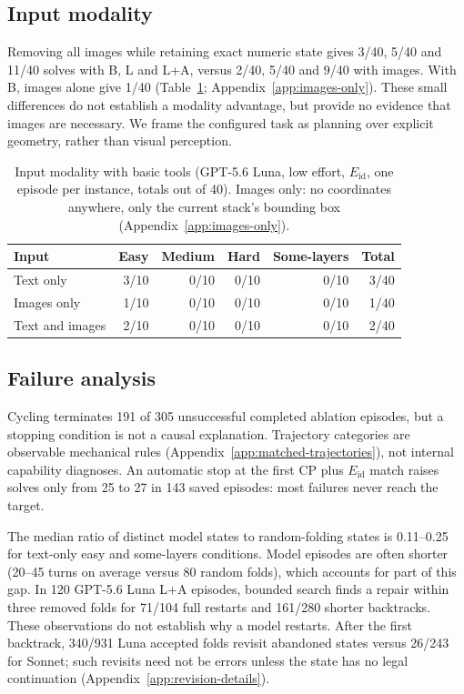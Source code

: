 \subsection{Input modality}
\label{sec:results-matched}\label{sec:results-textonly}
Removing all images while retaining exact numeric state gives 3/40, 5/40 and 11/40
solves with B, L and L+A, versus 2/40, 5/40 and 9/40 with images. With B, images
alone give 1/40 (Table~\ref{tab:modality}; Appendix~\ref{app:images-only}). These small
differences do not establish a modality advantage, but provide no evidence that images
are necessary. We frame the configured task as planning over explicit geometry,
rather than visual perception.
\begin{table}[htbp]
\centering
\caption{Input modality with basic tools (GPT-5.6 Luna, low effort, $E_{\mathrm{id}}$, one episode
per instance, totals out of 40). Images only: no coordinates anywhere, only the current stack's
bounding box (Appendix~\ref{app:images-only}).}
\label{tab:modality}
\small
\begin{tabular}{lrrrrr}
\hline
Input & Easy & Medium & Hard & Some-layers & Total \\
\hline
Text only & 3/10 & 0/10 & 0/10 & 0/10 & 3/40 \\
Images only & 1/10 & 0/10 & 0/10 & 0/10 & 1/40 \\
Text and images & 2/10 & 0/10 & 0/10 & 0/10 & 2/40 \\
\hline
\end{tabular}
\end{table}
\subsection{Failure analysis}
\label{sec:results-failures}
Cycling terminates 191 of 305 unsuccessful completed ablation episodes, but a stopping
condition is not a causal explanation. Trajectory categories are observable mechanical
rules (Appendix~\ref{app:matched-trajectories}), not internal capability diagnoses.
An automatic stop at the first CP plus $E_{\mathrm{id}}$ match raises solves only
from 25 to 27 in 143 saved episodes: most failures never reach the target.

The median ratio of distinct model states to random-folding states is 0.11--0.25
for text-only easy and some-layers conditions. Model episodes are often shorter
(20--45 turns on average versus 80 random folds), which accounts for part of this gap.
In 120 GPT-5.6 Luna L+A episodes, bounded search finds a repair within three removed
folds for 71/104 full restarts and 161/280 shorter backtracks. These observations do
not establish why a model restarts. After the first backtrack, 340/931 Luna accepted
folds revisit abandoned states versus 26/243 for Sonnet; such revisits need not be
errors unless the state has no legal continuation (Appendix~\ref{app:revision-details}).

